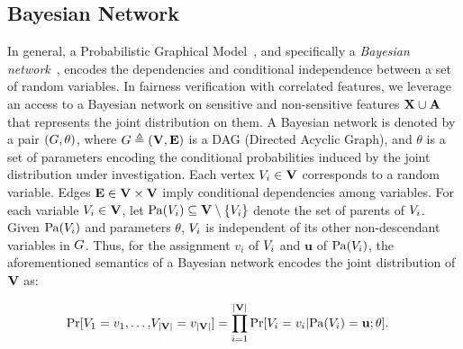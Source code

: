 \subsection{Bayesian Network}
\label{chapter_fairness_preliminaries_BN}
In general, a Probabilistic Graphical Model~\cite{koller2009probabilistic}, and specifically a \textit{Bayesian network}~\cite{pearl1985bayesian,chavira2008probabilistic}, encodes the dependencies and conditional independence between a set of random variables. In fairness verification with correlated features, we leverage an access to a Bayesian network on sensitive and non-sensitive features $ \mathbf{X} \cup \mathbf{A} $ that represents the joint distribution on them. A Bayesian network is denoted by a pair $ (G, \theta)$, where $ G \triangleq (\mathbf{V}, \mathbf{E}) $ is a DAG (Directed Acyclic Graph), and $\theta$ is a set of parameters encoding the conditional probabilities induced by the joint distribution under investigation. Each vertex $V_i \in \mathbf{V}$ corresponds to a random variable. Edges $ \mathbf{E} \in \mathbf{V} \times \mathbf{V} $ imply conditional dependencies among variables. For each variable $ V_i \in \mathbf{V} $, let $ \mathrm{Pa}(V_i) \subseteq \mathbf{V} \setminus \{V_i\} $ denote the set of parents of $ V_i $. Given $\mathrm{Pa}(V_i)$ and parameters $\theta$, $ V_i $ is independent of its other non-descendant variables in $G$. Thus, for the assignment $ v_i $ of $ V_i $ and $ \mathbf{u} $ of $ \mathrm{Pa}(V_i) $, the aforementioned semantics of a Bayesian network encodes the joint distribution of $\mathbf{V}$ as:

\begin{equation}
	\begin{split}
		\Pr[V_1=v_1, \dots, &V_{|\mathbf{V}|}=v_{|\mathbf{V}|}] = \prod_{i=1}^{|\mathbf{V}|} \Pr[V_i = v_i | \mathrm{Pa}(V_i) = \mathbf{u}; \theta].
	\end{split}
	\label{fvgm_eq:BN}
\end{equation}



